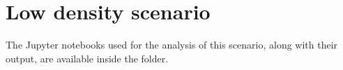 \section{Low density scenario}\label{sec:low-density}

The Jupyter notebooks used for the analysis of this scenario, along with their
output, are available inside the  folder.




